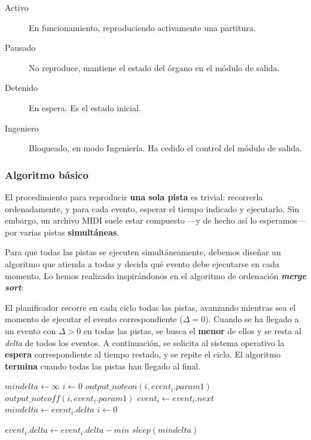 \smallskip

\begin{description}
	\item[Activo] En funcionamiento, reproduciendo activamente una partitura.
	\item[Pausado] No reproduce, mantiene el estado del órgano en el módulo de salida.
	\item[Detenido] En espera. Es el estado inicial.
	\item[Ingeniero] Bloqueado, en modo Ingeniería. Ha cedido el control del módulo de salida.
\end{description}

\subsubsection{Algoritmo básico}

El procedimiento para reproducir \textbf{una sola pista} es trivial: recorrerla ordenadamente, y para cada evento, esperar el tiempo indicado y ejecutarlo. Sin embargo, un archivo \acrshort{MIDI} suele estar compuesto ---y de hecho así lo esperamos--- por varias pistas \textbf{simultáneas}.

Para que todas las pistas se ejecuten simultáneamente, debemos diseñar un algoritmo que atienda a todas y decida qué evento debe ejecutarse en cada momento. Lo hemos realizado inspirándonos en el algoritmo de ordenación \textbf{\textit{merge sort}}:

El planificador recorre en cada ciclo todas las pistas, avanzando mientras sea el momento de ejecutar el evento correspondiente ($\Delta=0$). Cuando se ha llegado a un evento con $\Delta > 0$ en todas las pistas, se busca el \textbf{menor} de ellos y se resta al \textit{delta} de todos los eventos. A continuación, se solicita al sistema operativo la \textbf{espera} correspondiente al tiempo restado, y se repite el ciclo. El algoritmo \textbf{termina} cuando todas las pistas han llegado al final.

\smallskip

\begin{algorithmic}
	\LOOP
		\STATE $mindelta \gets \infty$
		\STATE $i\gets 0$
					\STATE $output\_noteon(i, event_i.param1)$
				\ELSE 
						\STATE $output\_noteoff (i, event_i.param1)$
					\ENDIF
				\ENDIF
				\STATE $event_i \gets event_i.next$
			\ENDWHILE
				\STATE $mindelta \gets event_i.delta$
			\ENDIF
		\ENDWHILE
		\STATE $i \gets 0$
		
			\STATE $event_i.delta \gets event_i.delta - min$
		\ENDWHILE
		\STATE $sleep (mindelta)$
	\ENDLOOP
\end{algorithmic}

